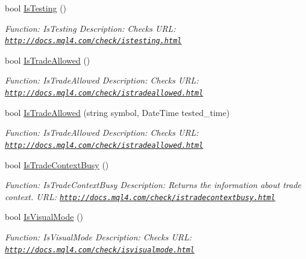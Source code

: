 \begin{DoxyCompactItemize}
bool \hyperlink{class_m_q_l4_c_sharp_1_1_base_1_1_m_q_l_base_a29369d80240c973b5072e3db7c515f12}{Is\+Testing} ()
\begin{DoxyCompactList}\small\item\em Function\+: Is\+Testing Description\+: Checks U\+RL\+: \href{http://docs.mql4.com/check/istesting.html}{\tt http\+://docs.\+mql4.\+com/check/istesting.\+html} \end{DoxyCompactList}\item 
bool \hyperlink{class_m_q_l4_c_sharp_1_1_base_1_1_m_q_l_base_a6a33050fffabe252e6576a4023ab8c67}{Is\+Trade\+Allowed} ()
\begin{DoxyCompactList}\small\item\em Function\+: Is\+Trade\+Allowed Description\+: Checks U\+RL\+: \href{http://docs.mql4.com/check/istradeallowed.html}{\tt http\+://docs.\+mql4.\+com/check/istradeallowed.\+html} \end{DoxyCompactList}\item 
bool \hyperlink{class_m_q_l4_c_sharp_1_1_base_1_1_m_q_l_base_ae30e4a764819f875e053922e4e36257a}{Is\+Trade\+Allowed} (string symbol, Date\+Time tested\+\_\+time)
\begin{DoxyCompactList}\small\item\em Function\+: Is\+Trade\+Allowed Description\+: Checks U\+RL\+: \href{http://docs.mql4.com/check/istradeallowed.html}{\tt http\+://docs.\+mql4.\+com/check/istradeallowed.\+html} \end{DoxyCompactList}\item 
bool \hyperlink{class_m_q_l4_c_sharp_1_1_base_1_1_m_q_l_base_a5e07a0854aa55fef8c481b85ce9aac58}{Is\+Trade\+Context\+Busy} ()
\begin{DoxyCompactList}\small\item\em Function\+: Is\+Trade\+Context\+Busy Description\+: Returns the information about trade context. U\+RL\+: \href{http://docs.mql4.com/check/istradecontextbusy.html}{\tt http\+://docs.\+mql4.\+com/check/istradecontextbusy.\+html} \end{DoxyCompactList}\item 
bool \hyperlink{class_m_q_l4_c_sharp_1_1_base_1_1_m_q_l_base_a248569c7655b542cd33ec294a62d4615}{Is\+Visual\+Mode} ()
\begin{DoxyCompactList}\small\item\em Function\+: Is\+Visual\+Mode Description\+: Checks U\+RL\+: \href{http://docs.mql4.com/check/isvisualmode.html}{\tt http\+://docs.\+mql4.\+com/check/isvisualmode.\+html} \end{DoxyCompactList}\item 

\end{DoxyCompactItemize}
